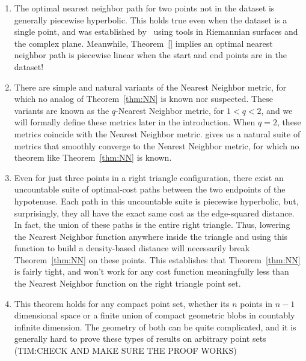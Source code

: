 \begin{enumerate}

\item The optimal nearest neighbor path for two points not in the dataset
	is generally piecewise hyperbolic. This holds true even when the
		dataset is a single point, and was established by~\cite{}
		using tools in Riemannian surfaces and the complex plane.
		Meanwhile, Theorem~\ref{} implies an optimal nearest
		neighbor path is piecewise linear when the start and end
		points are in the dataset!

\item There are simple and natural variants of the Nearest Neighbor metric,
	for which no analog of Theorem~\ref{thm:NN} is known nor suspected.
		These variants are known as the $q$-Nearest Neighbor
		metric, for $1 < q < 2$, and we will formally define these
		metrics later in the introduction. When $q=2$, these
		metrics coincide with the Nearest Neighbor metric. %
		gives us a natural suite of metrics that smoothly converge
		to the Nearest Neighbor metric, for which no theorem like
		Theorem~\ref{thm:NN} is known.

\item Even for just three points in a right triangle configuration, there
	exist an uncountable suite of optimal-cost paths between the two
		endpoints of the hypotenuse. Each path in this uncountable
		suite is piecewise hyperbolic, but, surprisingly, they all
		have the exact same cost as the edge-squared distance. In
		fact, the union of these paths is the entire right
		triangle. Thus, lowering the Nearest Neighbor function
		anywhere inside the triangle and using this function to
		build a density-based distance will necessarily break
		Theorem~\ref{thm:NN} on these points. This establishes that
		Theorem~\ref{thm:NN} is fairly tight, and won't work for
		any cost function meaningfully less than the Nearest
		Neighbor function on the right triangle point set.

\item This theorem holds for any compact point set, whether its $n$ points
	in $n-1$ dimensional space or a finite union of compact geometric
		blobs in countably infinite dimension. The geometry of both
		can be quite complicated, and it is generally hard to prove
		these types of results on arbitrary point sets (TIM:CHECK
		AND MAKE SURE THE PROOF WORKS)

\end{enumerate}

